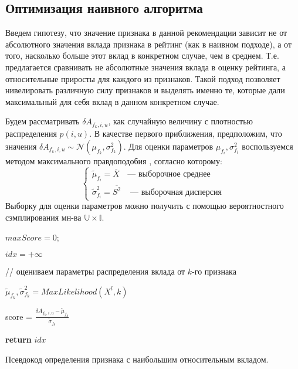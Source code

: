 \documentclass[12pt,a4paper]{report}
\begin{document}
\subsection{Оптимизация наивного алгоритма}
Введем гипотезу, что значение признака в данной рекомендации зависит не от абсолютного значения вклада признака в рейтинг (как в наивном подходе), а от того, насколько больше этот вклад в конкретном случае, чем в среднем. Т.е. предлагается сравнивать не абсолютные значения вклада в оценку рейтинга, а относительные приросты для каждого из признаков.
Такой подход позволяет нивелировать различную силу признаков и выделять именно те, которые дали максимальный для себя вклад в данном конкретном случае.

Будем рассматривать $\delta A_{f_k, i, u}$, как случайную величину с плотностью распределения $p(i, u)$.
В качестве первого приближения, предположим, что значения $\delta A_{f_k, i, u} \sim\mathcal{N}(\mu_{f_k}, \sigma_{f_k}^2)$.
Для оценки параметров $\mu_{f_i}, \sigma_{f_i}^2$ воспользуемся методом максимального правдоподобия \cite{Mle}, согласно которому:
\begin{equation*}
\begin{cases}
\tilde{\mu}_{f_i} = \overline{X} &\text{--- выборочное среднее} 
\\ \tilde{\sigma}_{f_i}^2 = \overline{S^2} &\text{ --- выборочная дисперсия}
\end{cases}
\end{equation*}
Выборку для оценки параметров можно получить с помощью вероятностного сэмплирования мн-ва $\mathbb{U} \times \mathbb{I}$.


\begin{algorithm}[H]
\SetAlgoLined
{}

$maxScore = 0$;

$idx = +\infty$

 {

// оцениваем параметры распределения вклада от $k$-го признака

$\tilde{\mu}_{f_k}, \tilde{\sigma}_{f_k}^2 = MaxLikelihood(X^l, k)$

score = $\frac{\delta A_{f_k, i, u} - \tilde{\mu}_{f_k}}{\tilde{\sigma}_{f_k}}$

}

\textbf{return} $idx$
\caption{Псевдокод определения признака с наибольшим относительным вкладом.}
\label{alg:normalAI}
\end{algorithm}
\end{document}
